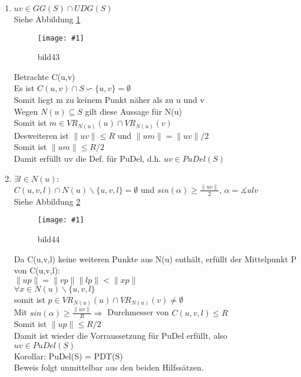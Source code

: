 \documentclass{article}
\newcommand{\bild}[4]{ %
	\begin{figure}[h!]
		\centering
		\texttt{[image: \#1]}
		\caption{#3}
		\label{#4}
	\end{figure}	
}
\newcommand{\sieheBild}[4]{
	Siehe Abbildung \ref{#4}
	\bild{#1}{#2}{#3}{#4}
}
\newcommand{\doubleAbs}[1]{
	\|#1\|
}
\begin{document}
\begin{enumerate}
	\item $uv \in GG(S) \cap UDG(S)$\\
\sieheBild{Bilder/43.png}{0.4}{bild43}{Bild 43}
	Betrachte C(u,v)\\
	Es ist $C(u,v) \cap S \backsim \{u,v\} = \emptyset$ \\
	Somit liegt m zu keinem Punkt näher als zu u und v\\
	Wegen $N(u)  \subseteq S$ gilt diese Aussage für N(u)\\
	Somit ist $m \in VR_{N(u)}(u) \cap VR_{N(u)}(v)$\\
	Desweiteren ist $\doubleAbs{uv} \leq R$ und $\doubleAbs{um} = \doubleAbs{uv}/2$\\
	Somit ist $\doubleAbs{um} \leq R/2$\\
	Damit erfüllt uv die Def. für PuDel, d.h. $uv \in PuDel(S)$
	
	\item $\exists l \in N(u):$ \\
	$C(u,v,l) \cap N(u) \backslash \{u,v,l\} = \emptyset$ und $sin(\alpha) \geq \frac{\doubleAbs{uv}}{2}$, $\alpha = \measuredangle u l v$\\
\sieheBild{Bilder/44.png}{0.4}{bild44}{Bild 44}
	Da C(u,v,l) keine weiteren Punkte aus N(u) enthält, erfüllt der Mittelpunkt P von C(u,v,l): \\
	$\doubleAbs{up} = \doubleAbs{vp} \doubleAbs{lp} < \doubleAbs{xp}$\\
	$\forall x \in N(u) \backslash \{u,v,l\}$\\
	somit ist $p \in VR_{N(u)}(u) \cap VR_{N(u)}(v) \neq \emptyset$\\
	Mit $sin(\alpha) \geq \frac{\doubleAbs{uv}}{R} \Rightarrow$ Durchmesser von $C(u,v,l) \leq R$\\
	Somit ist $\doubleAbs{up} \leq R/2$\\
	Damit ist wieder die Vorraussetzung für PuDel erfüllt, also\\
	$uv \in PuDel(S)$\\
	Korollar: PuDel(S) = PDT(S)\\
	Beweis folgt unmittelbar aus den beiden Hilfssätzen. 
	
\end{enumerate}
\end{document}
